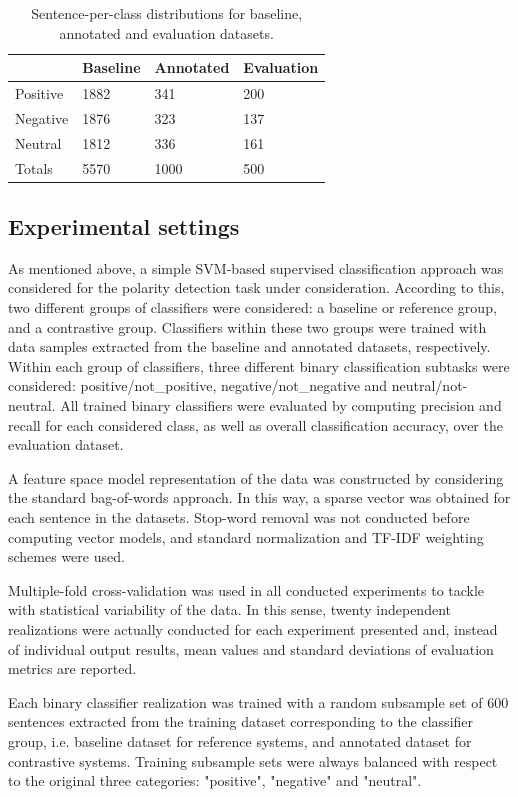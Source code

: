 \documentclass[11pt,letterpaper]{article}
\begin{document}
\begin{table}
\begin{tabular}{|l|l|l|l|}
\hline
&Baseline &Annotated &Evaluation \\
\hline
Positive &1882 &341 &200 \\
\hline
Negative &1876 &323 &137 \\
\hline
Neutral &1812 &336 &161 \\
\hline
Totals &5570 &1000 &500 \\
\hline
\end{tabular}
\caption{Sentence-per-class distributions for baseline, annotated and evaluation datasets.}
\label{tc_corpus}
\end{table}

\subsection{Experimental settings}
As mentioned above, a simple SVM-based supervised classification approach was considered for the
polarity detection task under consideration. According to this, two different groups of classifiers were 
considered: a baseline or reference group, and a contrastive group. Classifiers within these two groups were
trained with data samples extracted from the baseline and annotated datasets, respectively. Within each group 
of classifiers, three different binary classification subtasks were considered: positive/not\_positive, 
negative/not\_negative and neutral/not-neutral. All trained binary classifiers were evaluated by computing 
precision and recall for each considered class, as well as overall classification accuracy, over the 
evaluation dataset.

A feature space model representation of the data was constructed by considering the standard bag-of-words approach. 
In this way, a sparse vector was obtained for each sentence in the datasets. Stop-word removal was not
conducted before computing vector models, and standard normalization and TF-IDF weighting schemes were used.

Multiple-fold cross-validation was used in all conducted experiments to tackle with statistical variability of the 
data. In this sense, twenty independent realizations were actually conducted for each experiment presented and,
instead of individual output results, mean values and standard deviations of evaluation metrics are reported.

Each binary classifier realization was trained with a random subsample set of 600 sentences extracted from 
the training dataset corresponding to the classifier group, i.e. baseline dataset for reference systems, 
and annotated dataset for contrastive systems. Training subsample sets were always balanced with respect to 
the original three categories: "positive", "negative" and "neutral".
\end{document}
